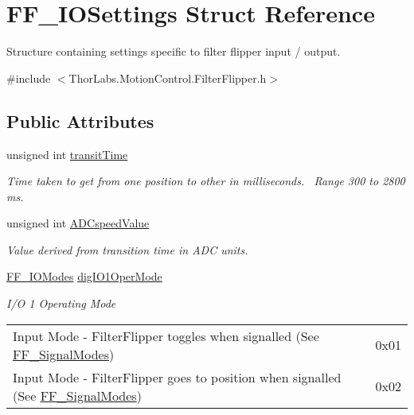 \hypertarget{struct_f_f___i_o_settings}{}\section{F\+F\+\_\+\+I\+O\+Settings Struct Reference}
\label{struct_f_f___i_o_settings}


Structure containing settings specific to filter flipper input / output.  




{\ttfamily \#include $<$Thor\+Labs.\+Motion\+Control.\+Filter\+Flipper.\+h$>$}

\subsection*{Public Attributes}
\begin{DoxyCompactItemize}
\item 
unsigned int \hyperlink{struct_f_f___i_o_settings_a89e6109b780b1b53ffc2ebc74e3ec902}{transit\+Time}
\begin{DoxyCompactList}\small\item\em Time taken to get from one position to other in milliseconds.~\newline
 Range 300 to 2800 ms. \end{DoxyCompactList}\item 
unsigned int \hyperlink{struct_f_f___i_o_settings_a6f718d677ca4d6e60e666f50619a890c}{A\+D\+Cspeed\+Value}
\begin{DoxyCompactList}\small\item\em Value derived from transition time in A\+DC units. \end{DoxyCompactList}\item 
\hyperlink{group___filter_flipper_ga3f9223ae197e5703d709034a238d3925}{F\+F\+\_\+\+I\+O\+Modes} \hyperlink{struct_f_f___i_o_settings_afdac200b0f2def426f3f584456bc6286}{dig\+I\+O1\+Oper\+Mode}
\begin{DoxyCompactList}\small\item\em I/O 1 Operating Mode \tabulinesep=1mm
\begin{longtabu} spread 0pt [c]{*2{|X[-1]}|}
\hline
Input Mode -\/ Filter\+Flipper toggles when signalled (See \hyperlink{group___filter_flipper_ga0049497885ad3480ad2ccbb1d354809a}{F\+F\+\_\+\+Signal\+Modes})&0x01 \\
Input Mode -\/ Filter\+Flipper goes to position when signalled (See \hyperlink{group___filter_flipper_ga0049497885ad3480ad2ccbb1d354809a}{F\+F\+\_\+\+Signal\+Modes})&0x02 \\

\end{longtabu}
\end{DoxyCompactList}
\end{DoxyCompactItemize}
